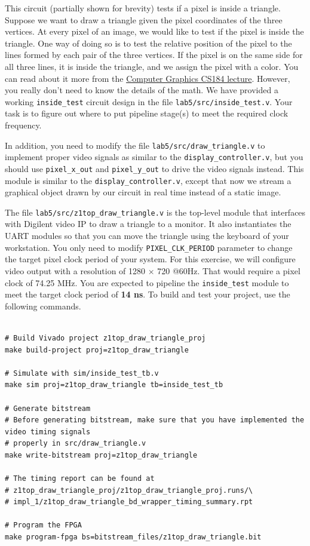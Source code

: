 \documentclass[11pt]{article}
\begin{document}
This circuit (partially shown for brevity) tests if a pixel is inside a triangle. Suppose we want to draw a triangle given the pixel coordinates of the three vertices. At every pixel of an image, we would like to test if the pixel is inside the triangle. One way of doing so is to test the relative position of the pixel to the lines formed by each pair of the three vertices. If the pixel is on the same side for all three lines, it is inside the triangle, and we assign the pixel with a color. You can read about it more from the \href{https://cs184.eecs.berkeley.edu/sp19/lecture/2/rasterization}{Computer Graphics CS184 lecture}. However, you really don't need to know the details of the math. We have provided a working \verb|inside_test| circuit design in the file \verb|lab5/src/inside_test.v|. Your task is to figure out where to put pipeline stage(s) to meet the required clock frequency.

In addition, you need to modify the file \verb|lab5/src/draw_triangle.v| to implement proper video signals as similar to the \verb|display_controller.v|, but you should use \verb|pixel_x_out| and \verb|pixel_y_out| to drive the video signals instead. This module is similar to the \verb|display_controller.v|, except that now we stream a graphical object drawn by our circuit in real time instead of a static image.

The file \verb|lab5/src/z1top_draw_triangle.v| is the top-level module that interfaces with Digilent video IP to draw a triangle to a monitor. It also instantiates the UART modules so that you can move the triangle using the keyboard of your workstation.
You only need to modify \verb|PIXEL_CLK_PERIOD| parameter to change the target pixel clock period of your system. For this exercise, we will configure video output with a resolution of 1280 $\times$ 720 @60Hz. That would require a pixel clock of 74.25 MHz. You are expected to pipeline the \verb|inside_test| module to meet the target clock period of \textbf{14 ns}. To build and test your project, use the following commands.

\begin{verbatim}

# Build Vivado project z1top_draw_triangle_proj
make build-project proj=z1top_draw_triangle

# Simulate with sim/inside_test_tb.v
make sim proj=z1top_draw_triangle tb=inside_test_tb

# Generate bitstream
# Before generating bitstream, make sure that you have implemented the video timing signals
# properly in src/draw_triangle.v
make write-bitstream proj=z1top_draw_triangle

# The timing report can be found at
# z1top_draw_triangle_proj/z1top_draw_triangle_proj.runs/\
# impl_1/z1top_draw_triangle_bd_wrapper_timing_summary.rpt

# Program the FPGA
make program-fpga bs=bitstream_files/z1top_draw_triangle.bit
\end{verbatim}
\end{document}
